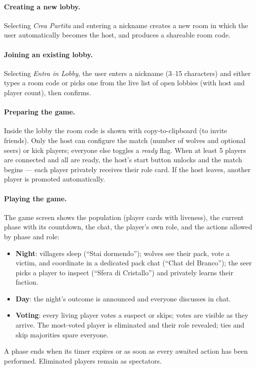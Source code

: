 \documentclass{scrartcl}
\begin{document}
\paragraph{Creating a new lobby.}
Selecting \emph{Crea Partita} and entering a nickname creates a new room in which
the user automatically becomes the host, and produces a shareable room code.

\paragraph{Joining an existing lobby.}
Selecting \emph{Entra in Lobby}, the user enters a nickname (3--15 characters) and
either types a room code or picks one from the live list of open lobbies (with
host and player count), then confirms.

\paragraph{Preparing the game.}
Inside the lobby the room code is shown with copy-to-clipboard (to invite
friends). Only the host can configure the match (number of wolves and optional
seers) or kick players; everyone else toggles a \emph{ready} flag. When at least 5
players are connected and all are ready, the host's start button unlocks and the
match begins --- each player privately receives their role card. If the host
leaves, another player is promoted automatically.

\paragraph{Playing the game.}
The game screen shows the population (player cards with liveness), the current
phase with its countdown, the chat, the player's own role, and the actions allowed
by phase and role:
\begin{itemize}
      \item \textbf{Night}: villagers sleep (``Stai dormendo''); wolves see their pack,
            vote a victim, and coordinate in a dedicated pack chat (``Chat del Branco'');
            the seer picks a player to inspect (``Sfera di Cristallo'') and privately learns
            their faction.
      \item \textbf{Day}: the night's outcome is announced and everyone discusses in
            chat.
      \item \textbf{Voting}: every living player votes a suspect or skips; votes are
            visible as they arrive. The most-voted player is eliminated and their role
            revealed; ties and skip majorities spare everyone.
\end{itemize}
A phase ends when its timer expires or as soon as every awaited action has been
performed. Eliminated players remain as spectators.
\end{document}
